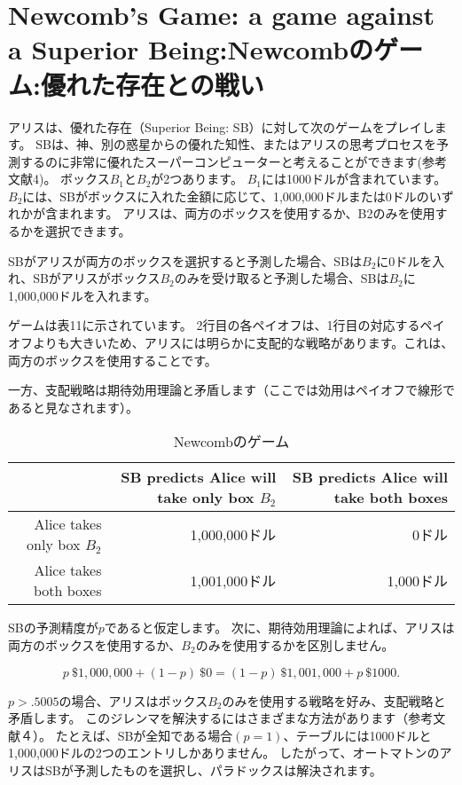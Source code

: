 \section{Newcomb’s Game: a game against a Superior Being:Newcombのゲーム:優れた存在との戦い}

アリスは、優れた存在（Superior Being: SB）に対して次のゲームをプレイします。 SBは、神、別の惑星からの優れた知性、またはアリスの思考プロセスを予測するのに非常に優れたスーパーコンピューターと考えることができます(参考文献4)。
ボックス$B_1$と$B_2$が2つあります。 $B_1$には1000ドルが含まれています。 $B_2$には、SBがボックスに入れた金額に応じて、1,000,000ドルまたは0ドルのいずれかが含まれます。 アリスは、両方のボックスを使用するか、B2のみを使用するかを選択できます。

SBがアリスが両方のボックスを選択すると予測した場合、SBは$B_2$に0ドルを入れ、SBがアリスがボックス$B_2$のみを受け取ると予測した場合、SBは$B_2$に1,000,000ドルを入れます。

ゲームは表11に示されています。 2行目の各ペイオフは、1行目の対応するペイオフよりも大きいため、アリスには明らかに支配的な戦略があります。これは、両方のボックスを使用することです。

一方、支配戦略は期待効用理論と矛盾します（ここでは効用はペイオフで線形であると見なされます）。


\begin{table}[htb]
\caption{Newcombのゲーム}
\centering
\begin{tabular}{|r|r|r|} \hline
 & SB predicts Alice will take only box $B_2$ & SB predicts Alice will take both boxes \\ \hline
Alice takes only box $B_2$ & 1,000,000ドル & 0ドル  \\
Alice takes both boxes & 1,001,000ドル & 1,000ドル  \\ \hline
\end{tabular}
\end{table} 

SBの予測精度が$p$であると仮定します。 次に、期待効用理論によれば、アリスは両方のボックスを使用するか、$B_2$のみを使用するかを区別しません。

\begin{equation}
\label{163}
p \ \$ 1,000,000+(1− p) \ \$ 0 = (1− p) \ \$ 1,001,000+ p \ \$ 1000.
\end{equation}

$p > .5005$の場合、アリスはボックス$B_2$のみを使用する戦略を好み、支配戦略と矛盾します。 このジレンマを解決するにはさまざまな方法があります（参考文献４）。
たとえば、SBが全知である場合$(p=1)$、テーブルには1000ドルと1,000,000ドルの2つのエントリしかありません。
したがって、オートマトンのアリスはSBが予測したものを選択し、パラドックスは解決されます。

